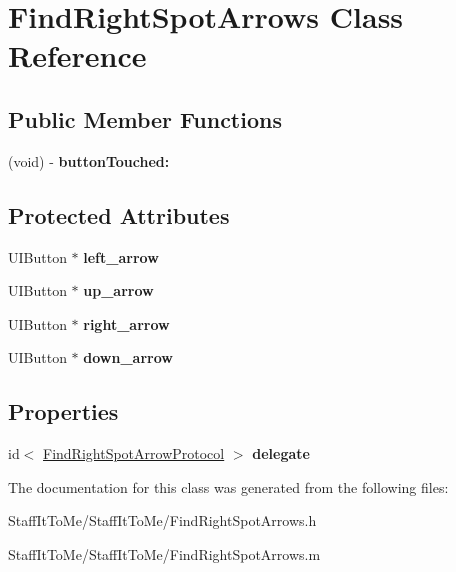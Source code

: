 \hypertarget{interface_find_right_spot_arrows}{
\section{\-Find\-Right\-Spot\-Arrows \-Class \-Reference}
\label{interface_find_right_spot_arrows}
}
\subsection*{\-Public \-Member \-Functions}
\begin{DoxyCompactItemize}
\item 
\hypertarget{interface_find_right_spot_arrows_a10d225088b3cc07848c2ec95085398bc}{
(void) -\/ {\bfseries button\-Touched\-:}}
\label{interface_find_right_spot_arrows_a10d225088b3cc07848c2ec95085398bc}

\end{DoxyCompactItemize}
\subsection*{\-Protected \-Attributes}
\begin{DoxyCompactItemize}
\item 
\hypertarget{interface_find_right_spot_arrows_ade78727110b634e06989b498829283ea}{
\-U\-I\-Button $\ast$ {\bfseries left\-\_\-arrow}}
\label{interface_find_right_spot_arrows_ade78727110b634e06989b498829283ea}

\item 
\hypertarget{interface_find_right_spot_arrows_a49d8a798036f2fb27514c94a8e6bb198}{
\-U\-I\-Button $\ast$ {\bfseries up\-\_\-arrow}}
\label{interface_find_right_spot_arrows_a49d8a798036f2fb27514c94a8e6bb198}

\item 
\hypertarget{interface_find_right_spot_arrows_a5300c7e6d64062d033ef37809bc569f8}{
\-U\-I\-Button $\ast$ {\bfseries right\-\_\-arrow}}
\label{interface_find_right_spot_arrows_a5300c7e6d64062d033ef37809bc569f8}

\item 
\hypertarget{interface_find_right_spot_arrows_a5a52dbae6f229e3959959161763dc86a}{
\-U\-I\-Button $\ast$ {\bfseries down\-\_\-arrow}}
\label{interface_find_right_spot_arrows_a5a52dbae6f229e3959959161763dc86a}

\end{DoxyCompactItemize}
\subsection*{\-Properties}
\begin{DoxyCompactItemize}
\item 
\hypertarget{interface_find_right_spot_arrows_acc72c6eef3ef7884ebec25995e705a71}{
id$<$ \hyperlink{protocol_find_right_spot_arrow_protocol-p}{\-Find\-Right\-Spot\-Arrow\-Protocol} $>$ {\bfseries delegate}}
\label{interface_find_right_spot_arrows_acc72c6eef3ef7884ebec25995e705a71}

\end{DoxyCompactItemize}


\-The documentation for this class was generated from the following files\-:\begin{DoxyCompactItemize}
\item 
\-Staff\-It\-To\-Me/\-Staff\-It\-To\-Me/\-Find\-Right\-Spot\-Arrows.\-h\item 
\-Staff\-It\-To\-Me/\-Staff\-It\-To\-Me/\-Find\-Right\-Spot\-Arrows.\-m\end{DoxyCompactItemize}
